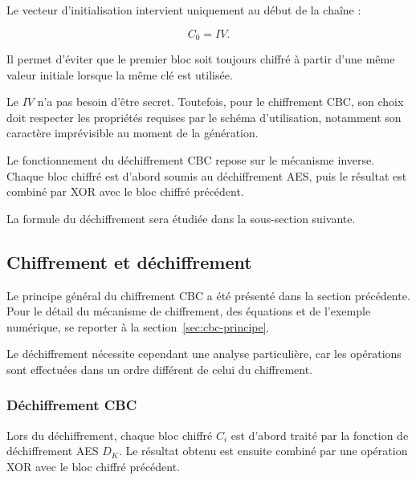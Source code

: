 \documentclass[12pt,a4paper]{article}
\begin{document}
Le vecteur d'initialisation intervient uniquement au début de la
chaîne :

\[
C_0=IV.
\]

Il permet d'éviter que le premier bloc soit toujours chiffré à partir
d'une même valeur initiale lorsque la même clé est utilisée.

Le $IV$ n'a pas besoin d'être secret. Toutefois, pour le chiffrement
CBC, son choix doit respecter les propriétés requises par le schéma
d'utilisation, notamment son caractère imprévisible au moment de la
génération.



Le fonctionnement du déchiffrement CBC repose sur le mécanisme
inverse. Chaque bloc chiffré est d'abord soumis au déchiffrement AES,
puis le résultat est combiné par XOR avec le bloc chiffré précédent.

La formule du déchiffrement sera étudiée dans la sous-section
suivante.


\subsection{Chiffrement et déchiffrement}

Le principe général du chiffrement CBC a été présenté dans la
section précédente. Pour le détail du mécanisme de chiffrement,
des équations et de l'exemple numérique, se reporter à la
section~\ref{sec:cbc-principe}.

Le déchiffrement nécessite cependant une analyse particulière,
car les opérations sont effectuées dans un ordre différent de
celui du chiffrement.



\subsubsection*{Déchiffrement CBC}

Lors du déchiffrement, chaque bloc chiffré $C_i$ est d'abord
traité par la fonction de déchiffrement AES $D_K$. Le résultat
obtenu est ensuite combiné par une opération XOR avec le bloc
chiffré précédent.
\end{document}
